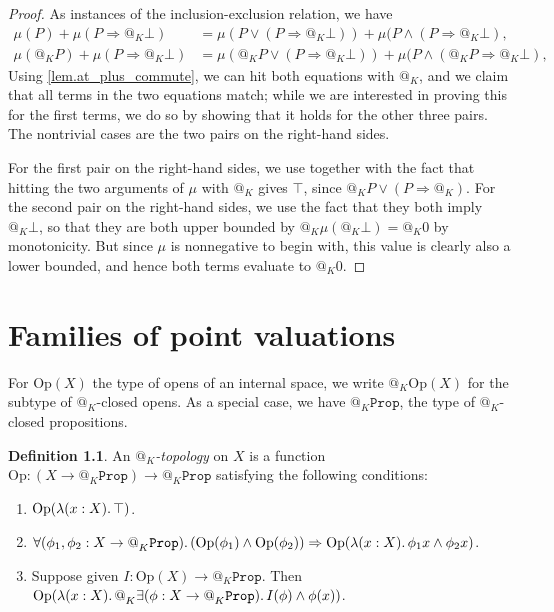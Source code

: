 \documentclass[11pt, oneside, article]{memoir}
\makeatletter
\theoremstyle{plain}
\theoremstyle{definition}
\newtheorem{definition}[theorem]{Definition}
\theoremstyle{remark}
\newcommand{\const}[1]{\mathtt{#1}}
\newcommand{\Set}[1]{\mathrm{#1}}
\newcommand{\Prop}{\const{Prop}}
\newcommand{\Op}{\Set{Op}}
\newcommand{\AtSymbol}{{@}}
\newcommand{\At}[2][]{\AtSymbol^{#1}_{#2}}
\newcommand{\imp}{\Rightarrow}
\makeatother
\begin{document}
\begin{proof}
	As instances of the inclusion-exclusion relation, we have
	\begin{align*}
		\mu(P) + \mu(P \imp \At{K} \bot) & = \mu(P \lor (P \imp \At{K} \bot)) +  \mu(P \land (P \imp \At{K} \bot),\\
		\mu(\At{K}P) + \mu(P \imp \At{K} \bot) & = \mu(\At{K} P \lor (P \imp \At{K} \bot)) + \mu(P \land (\At{K} P \imp \At{K} \bot),
	\end{align*}
	Using \cref{lem.at_plus_commute}, we can hit both equations with $\At{K}$, and we claim that all terms in the two equations match; while we are interested in proving this for the first terms, we do so by showing that it holds for the other three pairs. The nontrivial cases are the two pairs on the right-hand sides.
	
	For the first pair on the right-hand sides, we use  together with the fact that hitting the two arguments of $\mu$ with $\At{K}$ gives $\top$, since $\At{K} P \lor (P \imp \At{K})$. For the second pair on the right-hand sides, we use the fact that they both imply $\At{K} \bot$, so that they are both upper bounded by $\At{K} \mu(\At{K} \bot) = \At{K} 0$ by monotonicity. But since $\mu$ is nonnegative to begin with, this value is clearly also a lower bounded, and hence both terms evaluate to $\At{K} 0$.
\end{proof}

\chapter{Families of point valuations}

For $\Op(X)$ the type of opens of an internal space, we write $\At{K} \Op(X)$ for the subtype of $\At{K}$-closed opens. As a special case, we have $\At{K} \Prop$, the type of $\At{K}$-closed propositions. 

\begin{definition}
	An \emph{$\At{K}$-topology} on $X$ is a function $\Op:(X\to\At{K}\Prop)\to\At{K}\Prop$ satisfying the following conditions:
\begin{enumerate}
	\item $\Op(\lambda(x:X)\ldotp\top)$.
	\item $\forall(\phi_1,\phi_2:X\to\At{K}\Prop)\ldotp(\Op(\phi_1)\wedge\Op(\phi_2))\imp\Op(\lambda(x:X)\ldotp\phi_1 x\wedge\phi_2 x)$.
	\item Suppose given $I: \Op(X) \to \At{K}\Prop$. Then $\Op(\lambda(x:X)\ldotp\At{K}\exists(\phi:X\to\At{K}\Prop)\ldotp I(\phi)\wedge\phi (x))$.
\end{enumerate}
\end{definition}
\end{document}
